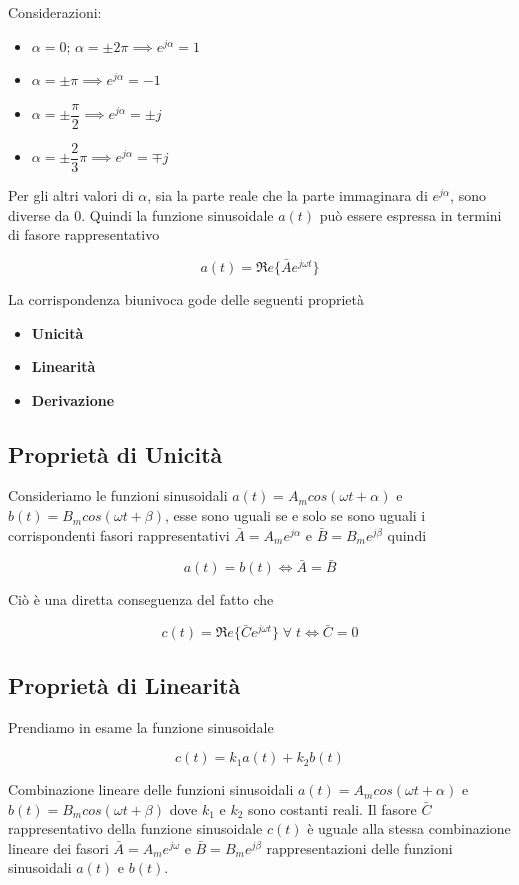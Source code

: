\documentclass[a4paper]{report}
\begin{document}
Considerazioni:
\begin{itemize}
\item $\alpha = 0$; $\alpha=\pm 2\pi \implies e^{j\alpha} = 1$
\item $\alpha = \pm \pi \implies e^{j\alpha} = -1$
\item $\alpha = \pm \dfrac{\pi}{2} \implies e^{j\alpha} = \pm j$
\item $\alpha = \pm \dfrac{2}{3}\pi \implies e^{j\alpha} = \mp j$
\end{itemize}
Per gli altri valori di $\alpha$, sia la parte reale che la parte
immaginara di $e^{j\alpha}$, sono diverse da $0$.
Quindi la funzione sinusoidale $a(t)$ pu\`o essere espressa in termini
di fasore rappresentativo

\[
a(t)=\Re e\{\bar{A}e^{j\omega t}\}
\]

La corrispondenza biunivoca gode delle seguenti propriet\`a
\begin{itemize}
\item {\bf Unicit\`a}
\item {\bf Linearit\`a}
\item {\bf Derivazione}
\end{itemize}

\subsection{Propriet\`a di Unicit\`a}
Consideriamo le funzioni sinusoidali $a(t) = A_mcos(\omega t+\alpha)$ e
$b(t) = B_mcos(\omega t+\beta)$, esse sono uguali se e solo se sono
uguali i corrispondenti fasori rappresentativi $\bar{A} =
A_me^{j\alpha}$ e $\bar{B} = B_me^{j\beta}$ quindi

\[
a(t)=b(t) \Longleftrightarrow \bar{A}=\bar{B}
\]

Ci\`o \`e una diretta conseguenza del fatto che

\[
c(t)=\Re e \{ \bar{C}e^{j\omega t} \}\; \forall\; t \Longleftrightarrow
\bar{C}=0
\]

\subsection{Propriet\`a di Linearit\`a}
Prendiamo in esame la funzione sinusoidale

\[
c(t) = k_1a(t)+k_2b(t)
\]

Combinazione lineare delle funzioni sinusoidali $a(t) = A_mcos(\omega
t + \alpha)$ e \\$b(t) = B_mcos(\omega t + \beta)$ dove $k_1$ e $k_2$
sono costanti reali.
Il fasore $\bar{C}$ rappresentativo della funzione sinusoidale $c(t)$
\`e uguale alla stessa combinazione lineare dei fasori $\bar{A} =
A_me^{j\omega}$ e $\bar{B} = B_me^{j\beta}$ rappresentazioni delle
funzioni sinusoidali $a(t)$ e $b(t)$.
\end{document}
